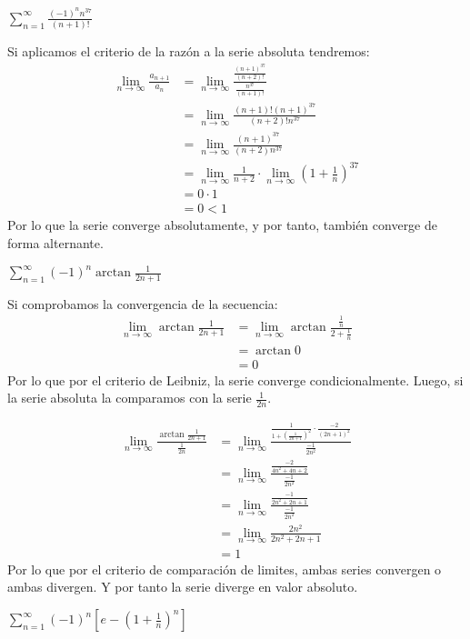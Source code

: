\documentclass[../main.tex]{subfiles}
\begin{document}
\question $\sum\limits_{n = 1}^\infty \frac{(-1)^n n^{37}}{(n+1)!}$

Si aplicamos el criterio de la razón a la serie absoluta tendremos:
\begin{align*}
    \lim_{n \to \infty} \frac{a_{n+1}}{a_n} &= \lim_{n \to \infty} \frac{\frac{(n+1)^{37}}{(n+2)!}}{\frac{n^{37}}{(n+1)!}}\\
    &= \lim_{n \to \infty} \frac{(n+1)! (n+1)^{37}}{(n+2)! n^37}\\
    &= \lim_{n \to \infty} \frac{(n+1)^37}{(n+2) n^{37}}\\
    &= \lim_{n \to \infty} \frac{1}{n+2} \cdot \lim_{n \to \infty} \left(1 + \frac{1}{n}\right)^{37}\\
    &= 0 \cdot 1\\
    &= 0 < 1
\end{align*}
Por lo que la serie converge absolutamente, y por tanto, también converge de forma alternante.


\question $\sum\limits_{n = 1}^\infty (-1)^n \arctan \frac{1}{2n+1}$

Si comprobamos la convergencia de la secuencia:
\begin{align*}
    \lim_{n \to \infty} \arctan \frac{1}{2n+1} &= \lim_{n \to \infty} \arctan \frac{\frac{1}{n}}{2 + \frac{1}{n}}\\
    &= \arctan 0\\
    &= 0
\end{align*}
Por lo que por el criterio de Leibniz, la serie converge condicionalmente. Luego, si la serie absoluta la comparamos con la serie $\frac{1}{2n}$.

\begin{align*}
    \lim_{n \to \infty} \frac{\arctan \frac{1}{2n+1}}{\frac{1}{2n}} &= \lim_{n \to \infty} \frac{\frac{1}{1+\left(\frac{1}{2n+1}\right)^2} \cdot \frac{-2}{(2n+1)^2}}{\frac{-1}{2n^2}}\\
    &= \lim_{n \to \infty} \frac{\frac{-2}{4n^2 + 4n + 2}}{\frac{-1}{2n^2}}\\
    &= \lim_{n \to \infty} \frac{\frac{-1}{2n^2 + 2n + 1}}{\frac{-1}{2n^2}}\\
    &= \lim_{n \to \infty} \frac{2n^2}{2n^2 + 2n +1}\\
    &= 1
\end{align*}
Por lo que por el criterio de comparación de limites, ambas series convergen o ambas divergen. Y por tanto la serie diverge en valor absoluto.

\question $\sum\limits_{n = 1}^\infty (-1)^n \left[e - \left(1 + \frac{1}{n}\right)^n\right]$
\end{document}
